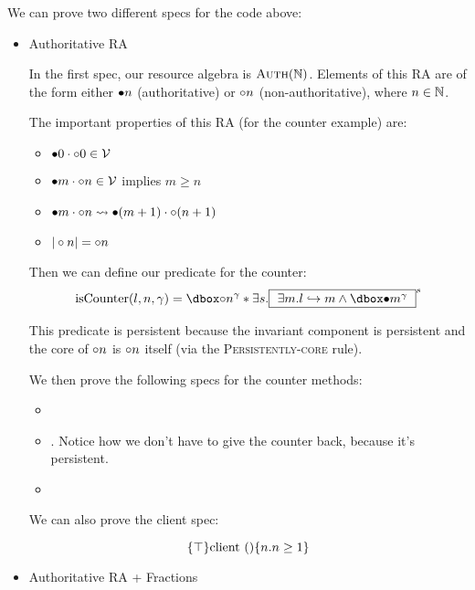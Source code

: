 We can prove two different specs for the code above:
\begin{itemize}
\item Authoritative RA

In the first spec, our resource algebra is $\textsc{Auth}(\mathbb{N})$. Elements of this RA are of the form either $\bullet n$ (authoritative) or $\circ n$ (non-authoritative), where $n \in \mathbb{N}$.

The important properties of this RA (for the counter example) are:
\begin{itemize}
\item $\bullet 0 \cdot \circ 0 \in \mathcal{V}$
\item $\bullet m \cdot \circ n \in \mathcal{V}$ implies $m \ge n$
\item $\bullet m \cdot \circ n \rightsquigarrow \bullet (m + 1) \cdot \circ (n + 1)$
\item $|\circ n| = \circ n$
\end{itemize}

Then we can define our predicate for the counter:
\[ \isCounter{l}{n}{\gamma} = \ownr{\naelem{n}} {\gamma} * \exists s.\inv{ $\exists m. \pointsto{l}{m} \land \ownr{\aelem{m}}{\gamma} $ }{s} \]

This predicate is persistent because the invariant component is persistent and the core of $\circ n$ is $\circ n$ itself (via the \textsc{Persistently-core} rule).

We then prove the following specs for the counter methods:
\begin{itemize}
\item {}
\item {}. Notice how we don't have to give the counter back, because it's persistent.
\item {}
\end{itemize}

We can also prove the client spec:

\[ \{\top\} \text{client} \text{ } () \{n. n \ge 1\} \]

\item Authoritative RA + Fractions
\end{itemize}